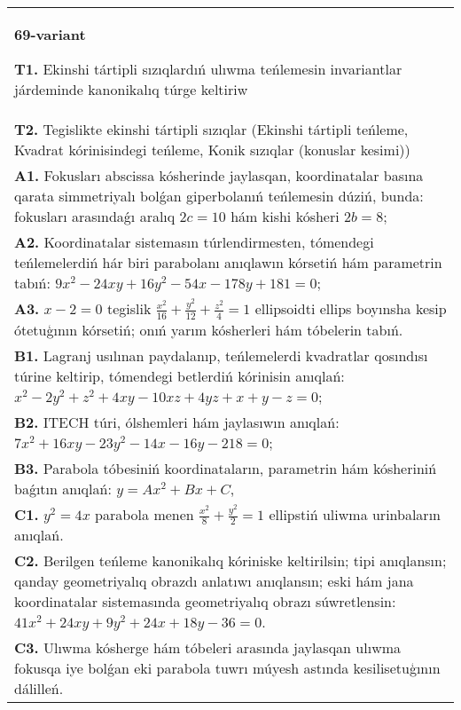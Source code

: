 \documentclass{article}
\begin{document}
\begin{tabular}{m{17cm}}
\textbf{69-variant}
\newline

\textbf{T1.} Ekinshi tártipli sızıqlardıń ulıwma teńlemesin invariantlar járdeminde kanonikalıq túrge keltiriw \\
\textbf{T2.} Tegislikte ekinshi tártipli sızıqlar (Ekinshi tártipli teńleme, Kvadrat kórinisindegi teńleme, Konik sızıqlar (konuslar kesimi)) \\
\textbf{A1.} Fokusları abscissa kósherinde jaylasqan, koordinatalar basına qarata simmetriyalı bolǵan giperbolanıń teńlemesin dúziń, bunda: fokusları arasındaǵı aralıq $2 c=10$ hám kishi kósheri $2 b=8$; \\
\textbf{A2.} Koordinatalar sistemasın túrlendirmesten, tómendegi teńlemelerdiń hár biri parabolanı anıqlawın kórsetiń hám parametrin tabıń: $9 x^2-24 x y+16 y^2-54 x-178 y+181=0$; \\
\textbf{A3.} $x-2=0$ tegislik $\frac{x^2}{16}+\frac{y^2}{12}+\frac{z^2}{4}=1$ ellipsoidti ellips boyınsha kesip ótetuģının kórsetiń; onıń yarım kósherleri hám tóbelerin tabıń. \\
\textbf{B1.} Lagranj usılınan paydalanıp, teńlemelerdi kvadratlar qosındısı túrine keltirip, tómendegi betlerdiń kórinisin anıqlań: $x^2-2 y^2+z^2+4 x y-10 x z+4 y z+x+y-z=0$; \\
\textbf{B2.} ITECH túri, ólshemleri hám jaylasıwın anıqlań: $7 x^2+16 x y-23 y^2-14 x-16 y-218=0$; \\
\textbf{B3.} Parabola tóbesiniń koordinataların, parametrin hám kósheriniń baǵıtın anıqlań: $y=A x^2+B x+C$, \\
\textbf{C1.} $y^2=4 x$ parabola menen $\frac{x^2}{8}+\frac{y^2}{2}=1$ ellipstiń uliwma urinbaların anıqlań. \\
\textbf{C2.} Berilgen teńleme kanonikalıq kóriniske keltirilsin; tipi anıqlansın; qanday geometriyalıq obrazdı anlatıwı anıqlansın; eski hám jana koordinatalar sistemasında geometriyalıq obrazı súwretlensin: $41 x^2+24 x y+9 y^2+24 x+18 y-36=0$. \\
\textbf{C3.} Ulıwma kósherge hám tóbeleri arasında jaylasqan ulıwma fokusqa iye bolǵan eki parabola tuwrı múyesh astında kesilisetuģının dálilleń. \\

\end{tabular}
\vspace{1cm}
\end{document}
